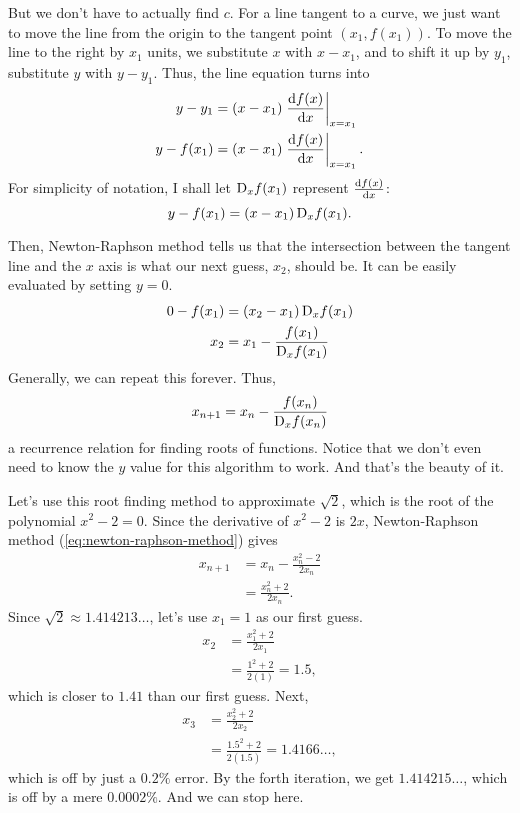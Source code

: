 But we don't have to actually find $c$. For a line tangent to a curve, we just want to move the line from the origin to the tangent point $(x_1, f(x_1))$. To move the line to the right by $x_1$ units, we substitute $x$ with $x - x_1$, and to shift it up by $y_1$, substitute $y$ with $y - y_1$. Thus, the line equation turns into
\begin{align}
	y - y_1 &= (x - x_1)\odv{f(x)}{x}_{x = x_1} \\
	y - f(x_1) &= (x - x_1)\odv{f(x)}{x}_{x = x_1}.
\end{align}
For simplicity of notation, I shall let $\mdif{x}f(x_1)$ represent $\odv{f(x)}{x}$:
\begin{equation}
	y - f(x_1) = (x - x_1)\mdif{x}f(x_1).
\end{equation}

Then, Newton-Raphson method tells us that the intersection between the tangent line and the $x$ axis is what our next guess, $x_2$, should be. It can be easily evaluated by setting $y = 0$.
\begin{align}
	0 - f(x_1) &= (x_2 - x_1)\mdif{x}f(x_1) \\
	x_2 &= x_1 - \frac{f(x_1)}{\mdif{x}f(x_1)}
\end{align}
Generally, we can repeat this forever. Thus,
\begin{equation}
	x_{n + 1} = x_n - \frac{f(x_n)}{\mdif{x}f(x_n)} \label{eq:newton-raphson-method}
\end{equation}
a recurrence relation for finding roots of functions. Notice that we don't even need to know the $y$ value for this algorithm to work. And that's the beauty of it.

Let's use this root finding method to approximate $\sqrt{2}$, which is the root of the polynomial $x^2 - 2 = 0$. Since the derivative of $x^2 - 2$ is $2x$, Newton-Raphson method (\cref{eq:newton-raphson-method}) gives
\begin{align}
	x_{n + 1} &= x_n - \frac{x_n^2 - 2}{2x_n} \\
			  &= \frac{x_n^2 + 2}{2x_n}.
\end{align}
Since $\sqrt{2} \approx 1.414213\dots$, let's use $x_1 = 1$ as our first guess.
\begin{align}
	x_2 &= \frac{x_1^2 + 2}{2x_1} \\
		&= \frac{1^2 + 2}{2(1)} = 1.5,
\end{align}
which is closer to $1.41$ than our first guess. Next,
\begin{align}
	x_3 &= \frac{x_2^2 + 2}{2x_2} \\
		&= \frac{1.5^2 + 2}{2(1.5)} = 1.4166\dots,
\end{align}
which is off by just a $0.2\%$ error. By the forth iteration, we get $1.414215\dots$, which is off by a mere $0.0002\%$. And we can stop here.

